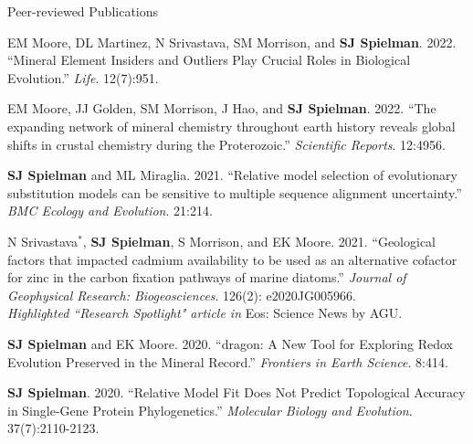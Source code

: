 \documentclass{resume} %
\begin{document}
\vspace*{0.35cm}
\begin{rSection}{Peer-reviewed Publications}
\vspace*{0.25cm}

\begin{etaremune}[leftmargin=1.5em]

\item EM Moore, DL Martinez, N Srivastava, SM Morrison, and \textbf{SJ Spielman}. 2022. ``Mineral Element Insiders and Outliers Play Crucial Roles in Biological Evolution.'' \emph{Life}. 12(7):951.

\item EM Moore, JJ Golden, SM Morrison, J Hao, and \textbf{SJ Spielman}. 2022. ``The expanding network of mineral chemistry throughout earth history reveals global shifts in crustal chemistry during the Proterozoic.'' \emph{Scientific Reports}. 12:4956.

\item \textbf{SJ Spielman} and ML Miraglia. 2021. ``Relative model selection of evolutionary substitution models can be sensitive to multiple sequence alignment uncertainty.'' \emph{BMC Ecology and Evolution}. 21:214.

\item N Srivastava$^\ast$, \textbf{SJ Spielman}, S Morrison, and EK Moore. 2021. ``Geological factors that impacted cadmium availability to be used as an alternative cofactor for zinc in the carbon fixation pathways of marine diatoms.'' \emph{Journal of Geophysical Research: Biogeosciences}. 126(2): e2020JG005966. \\
\emph{Highlighted ``Research Spotlight" article in} Eos: Science News by AGU.

\item \textbf{SJ Spielman} and EK Moore. 2020. ``dragon: A New Tool for Exploring Redox Evolution Preserved in the Mineral Record.'' \emph{Frontiers in Earth Science}. 8:414.

\item \textbf{SJ Spielman}. 2020. ``Relative Model Fit Does Not Predict Topological Accuracy in Single-Gene Protein Phylogenetics.'' \emph{Molecular Biology and Evolution}. 37(7):2110-2123.


\end{etaremune}
\end{rSection}
\end{document}
